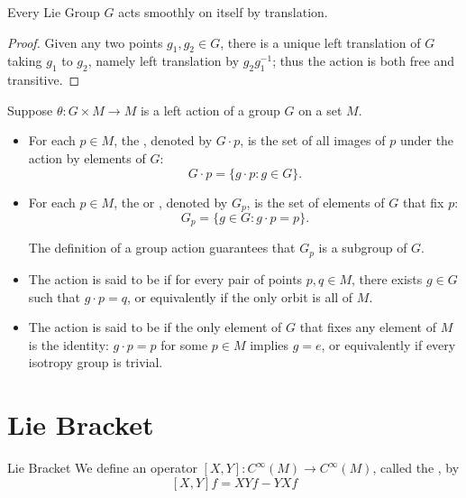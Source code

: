 \documentclass[../main.tex]{subfiles}
\begin{document}
\begin{example}{}{}
    Every Lie Group \(  G  \) acts smoothly on itself by translation.    
\end{example}
\begin{proof}
    Given any two points \(  g_1,g_2\in G  \), there is a unique left translation of \(  G  \) taking \(  g_1  \) to \(  g_2  \), namely left translation by \(  g_2g_1^{-1}   \); thus the action is both free and transitive.  
\end{proof}

\begin{definition}{}{}
   Suppose \(\theta: G \times M \to M\) is a left action of a group \(G\) on a set \(M\). 
\begin{itemize}
\item For each \(p \in M\), the , denoted by \(G \cdot p\), is the set of all images of \(p\) under the action by elements of \(G\):
\[
G \cdot p = \{g \cdot p : g \in G\}.
\]

\item For each \(p \in M\), the  or , denoted by \(G_p\), is the set of elements of \(G\) that fix \(p\):
\[
G_p = \{g \in G : g \cdot p = p\}.
\]

The definition of a group action guarantees that \(G_p\) is a subgroup of \(G\).

\item The action is said to be  if for every pair of points \(p, q \in M\), there exists \(g \in G\) such that \(g \cdot p = q\), or equivalently if the only orbit is all of \(M\).

\item The action is said to be  if the only element of \(G\) that fixes any element of \(M\) is the identity: \(g \cdot p = p\) for some \(p \in M\) implies \(g = e\), or equivalently if every isotropy group is trivial.
\end{itemize}
\end{definition}

\section{Lie Bracket}

\begin{definition}{Lie Bracket}{}
    We define an operator \(  \left[ X,Y \right]: C^{\infty}\left( M \right)\to C^{\infty}\left( M \right)     \), called the  , by \[
    \left[ X,Y \right]f= XYf-YXf 
    \]
\end{definition}
\end{document}

